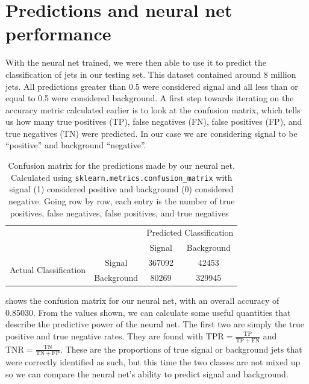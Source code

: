 \documentclass[11pt]{article}
\numberwithin{equation}{section}
\numberwithin{figure}{section}
\numberwithin{table}{section}
\begin{document}
\section{Predictions and neural net performance}\label{sec:Predictions}
With the neural net trained, we were then able to use it to predict the classification of jets in our testing set. This dataset contained around 8 million jets. All predictions greater than 0.5 were considered signal and all less than or equal to 0.5 were considered background. A first step towards iterating on the accuracy metric calculated earlier is to look at the confusion matrix, which tells us how many true positives (TP), false negatives (FN), false positives (FP), and true negatives (TN) were predicted. In our case we are considering signal to be ``positive'' and background ``negative''.

\begin{table}[h]
    \centering
    \begin{tabular}{cccc}
        \multicolumn{2}{c}{\multirow{2}{*}{}} & \multicolumn{2}{c}{Predicted Classification} \\ \cmidrule{3-4}
        \multicolumn{2}{c}{} & Signal & Background \\ \cmidrule(lr){3-3} \cmidrule(lr){4-4}
        \multirow{2}{*}{Actual Classification} & Signal & 367092 & 42453 \\ \cmidrule(lr){2-2}
        & Background & 80269 & 329945 \\ \cmidrule(lr){2-2}
    \end{tabular}
    \caption{Confusion matrix for the predictions made by our neural net. Calculated using \texttt{sklearn.metrics.confusion\_matrix} with signal (1) considered positive and background (0) considered negative. Going row by row, each entry is the number of true positives, false negatives, false positives, and true negatives~\cite{Confusion_Matrix}}
    \label{tbl:conf_matrix}
\end{table}

 shows the confusion matrix for our neural net, with an overall accuracy of 0.85030. From the values shown, we can calculate some useful quantities that describe the predictive power of the neural net. The first two are simply the true positive and true negative rates. They are found with $\mathrm{TPR}=\frac{\mathrm{TP}}{\mathrm{TP}+\mathrm{FN}}$ and $\mathrm{TNR}=\frac{\mathrm{TN}}{\mathrm{TN}+\mathrm{FP}}$. These are the proportions of true signal or background jets that were correctly identified as such, but this time the two classes are not mixed up so we can compare the neural net's ability to predict signal and background.
\end{document}
